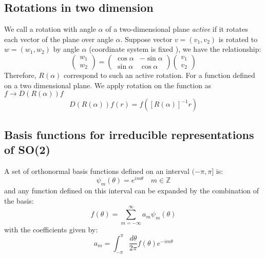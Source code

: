 \documentclass{amsart}
\theoremstyle{remark}
\theoremstyle{remark}
\theoremstyle{definition}
\begin{document}
\subsection{Rotations in two dimension}
We call a rotation with angle $\alpha$ of a two-dimensional plane \emph{active} 
if it rotates each vector of the plane over angle $\alpha$. 
Suppose vector $v = (v_1, v_2)$ is rotated to $w = (w_1, w_2)$ by angle $\alpha$ (coordinate system is fixed ), 
we have the relationship:
\begin{equation*}
    \left(\begin{matrix}
        w_1 \\ w_2
    \end{matrix}\right) = \left(\begin{matrix}
        \cos\alpha & -\sin\alpha \\ \sin\alpha & \cos\alpha
    \end{matrix}\right) \left(\begin{matrix}
        v_1 \\ v_2
    \end{matrix}\right)
\end{equation*}
Therefore, $R(\alpha)$ correspond to such an active rotation. 
For a function defined on a two dimensional plane. We apply rotation 
on the function as $f\to D(R(\alpha))f$
\begin{equation*}
    D(R(\alpha))f (r) = f([R(\alpha)]^{-1}r)
\end{equation*}

\vspace{10pt}
\subsection{Basis functions for irreducible representations of SO(2)}

A set of orthonormal basis functions defined on an interval $(-\pi, \pi]$ is:
\begin{equation*}
    \psi_m (\theta) = e^{im\theta} \quad m \in \mathbb{Z}
\end{equation*}
and any function defined on this interval can be expanded by the combination
of the basis:
\begin{equation*}
    f(\theta) = \sum_{m=-\infty}^{\infty} a_m \psi_m(\theta)
\end{equation*}
with the coefficients given by:
\begin{equation*}
    a_m = \int_{-\pi}^{\pi} \frac{d\theta}{2\pi} f(\theta) e^{-im\theta}
\end{equation*}
\end{document}
